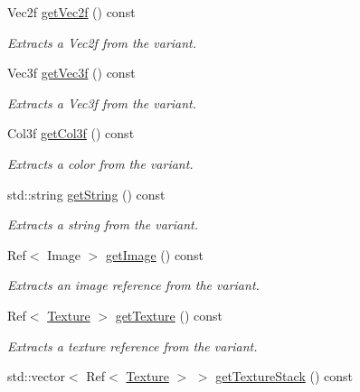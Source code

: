 \begin{DoxyCompactItemize}
Vec2f \hyperlink{structembree_1_1_variant_ac19158d725ff8749a0b49c1b6eac171b}{getVec2f} () const 
\begin{DoxyCompactList}\small\item\em Extracts a Vec2f from the variant. \item\end{DoxyCompactList}\item 
Vec3f \hyperlink{structembree_1_1_variant_aed1780d129281b9b6963117c0202e060}{getVec3f} () const 
\begin{DoxyCompactList}\small\item\em Extracts a Vec3f from the variant. \item\end{DoxyCompactList}\item 
Col3f \hyperlink{structembree_1_1_variant_a83a7315e8ae1d69f0fe365072147f02c}{getCol3f} () const 
\begin{DoxyCompactList}\small\item\em Extracts a color from the variant. \item\end{DoxyCompactList}\item 
std::string \hyperlink{structembree_1_1_variant_ae3b4b1c393ba99486060ad9d91f7a71f}{getString} () const 
\begin{DoxyCompactList}\small\item\em Extracts a string from the variant. \item\end{DoxyCompactList}\item 
Ref$<$ Image $>$ \hyperlink{structembree_1_1_variant_adcf549001c402c783ef6539035cd2b15}{getImage} () const 
\begin{DoxyCompactList}\small\item\em Extracts an image reference from the variant. \item\end{DoxyCompactList}\item 
Ref$<$ \hyperlink{classembree_1_1_texture}{Texture} $>$ \hyperlink{structembree_1_1_variant_a81c9570d30905908782be75f467f354a}{getTexture} () const 
\begin{DoxyCompactList}\small\item\em Extracts a texture reference from the variant. \item\end{DoxyCompactList}\item 
std::vector$<$ Ref$<$ \hyperlink{classembree_1_1_texture}{Texture} $>$ $>$ \hyperlink{structembree_1_1_variant_a1baf707cdcce30abade1b3c540840d25}{getTextureStack} () const 

\end{DoxyCompactItemize}
